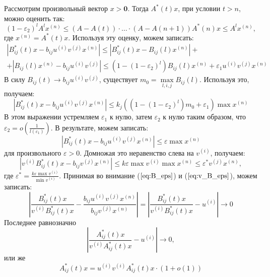 \documentclass[12pt]{article}
\begin{document}
Рассмотрим произвольный вектор $x > \mathbf{0}$. Тогда $A^*(t)x$, при условии $t > n$, можно оценить так:
\begin{equation}
	(1-\varepsilon_2)^l A^l x^{(n)} \le (A - A(t)) \cdot \ldots \cdot (A - A(n+1)) A^*(n)x \le A^l x^{(n)},
\end{equation}
где $x^{(n)} = A^*(t)x$. Используя эту оценку, можем записать:
\begin{multline*}
	\left| B^*_{ij}(t)x - b_{ij}u^{(i)}v^{(j)}x^{(n)} \right| \le \left| B^*_{ij}(t)x - B_{ij}(l)x^{(n)} \right| + \\
	+ \left| B_{ij}(l)x^{(n)} - b_{ij}u^{(i)}v^{(j)} \right| \le \left( 1-(1-\varepsilon_2)^l \right) B_{ij}(l)x^{(n)} + \varepsilon_1 u^{(i)}v^{(j)}x^{(n)}
\end{multline*}
В силу $B_{ij}(t) \rightarrow b_{ij}u^{(i)}v^{(j)}$, существует $m_0 = \max\limits_{l,i,j} B_{ij}(l)$. Используя это, получаем:
\begin{equation*}
	\left| B^*_{ij}(t)x - b_{ij}u^{(i)}v^{(j)}x^{(n)} \right| \le k_j \left( \left( 1-(1-\varepsilon_2)^l \right) m_0 + \varepsilon_1 \right) \max x^{(n)}
\end{equation*}
В этом выражении устремляем $\varepsilon_1$ к нулю, затем $\varepsilon_2$ к нулю таким образом, что $\varepsilon_2 = o\left( \frac{1}{l(\varepsilon_1)} \right)$. В результате, можем записать:
\begin{equation}
\label{eq:B_eps}
	\left| B^*_{ij}(t)x - b_{ij}u^{(i)}v^{(j)}x^{(n)} \right| \le \varepsilon \max x^{(n)}
\end{equation}
для произвольного $\varepsilon > 0$. Домножая это неравенство слева на $v^{(i)}$, получаем:
\begin{equation}
\label{eq:v_B_eps}
	\left| v^{(i)} B^*_{ij}(t)x - b_{ij}v^{(j)}x^{(n)} \right| \le k \varepsilon \max v^{(i)} \max x^{(n)} \le \varepsilon^* v^{(j)} x^{(n)},
\end{equation}
где $\varepsilon^* = \frac{k \varepsilon \max v^{(i)}}{\min v^{(i)}}$. Принимая во внимание ($\ref{eq:B_eps}$) и ($\ref{eq:v_B_eps}$), можем записать:
\begin{equation*}
	\left| \frac{B^*_{ij}(t)x}{v^{(i)} B^*_{ij}(t)x} - \frac{b_{ij} u^{(i)}v^{(j)}x^{(n)}}{b_{ij} v^{(j)}x^{(n)}} \right| = \left| \frac{B^*_{ij}(t)x}{v^{(i)} B^*_{ij}(t)x} - u^{(i)} \right| \rightarrow 0
\end{equation*}
Последнее равнозначно
\begin{equation*}
	\left| \frac{A^*_{ij}(t)x}{v^{(i)} A^*_{ij}(t)x} - u^{(i)} \right| \rightarrow 0,
\end{equation*}
или же
\begin{equation}
\label{eq:A_prop}
	A^*_{ij}(t)x = u^{(i)} v^{(i)} A^*_{ij}(t)x \cdot (1+o(1))
\end{equation}
\end{document}
